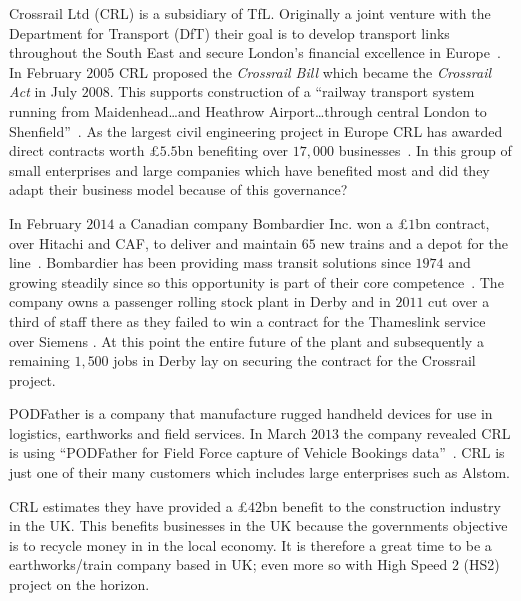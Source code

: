 {}

Crossrail Ltd (CRL) is a subsidiary of TfL.
Originally a joint venture with the Department for Transport (DfT) their goal is to develop transport links throughout the South East and secure London's financial excellence in Europe~\cite{crossrail:about}.
In February $2005$ CRL proposed the \emph{Crossrail Bill} which became the \emph{Crossrail Act} in July $2008$.
This supports construction of a ``railway transport system running from Maidenhead\dots and Heathrow Airport\dots through central London to Shenfield''~\cite{crossrail:act}.
As the largest civil engineering project in Europe CRL has awarded direct contracts worth \pounds $5.5$bn benefiting over $17,000$ businesses~\cite{crossrail:suppliers}.
In this group of small enterprises and large companies which have benefited most and did they adapt their business model because of this governance?  

In February $2014$ a Canadian company Bombardier Inc. won a \pounds $1$bn contract, over Hitachi and CAF, to deliver and maintain $65$ new trains and a depot for the line~\cite{bbc:bombardier,tfl:bombardier}.  
Bombardier has been providing mass transit solutions since $1974$ and growing steadily since so this opportunity is part of their core competence~\cite{bombardier:about}.
The company owns a passenger rolling stock plant in Derby and in $2011$ cut over a third of staff there as they failed to win a contract for the Thameslink service over Siemens \citeneeded{}.
At this point the entire future of the plant and subsequently a remaining $1,500$ jobs in Derby lay on securing the contract for the Crossrail project.

PODFather is a company that manufacture rugged handheld devices for use in logistics, earthworks and field services.
In March $2013$ the company revealed CRL is using ``PODFather for Field Force capture of Vehicle Bookings data''~\cite{podfather:crl}.
CRL is just one of their many customers which includes large enterprises such as Alstom. 


CRL estimates they have provided a \pounds $42$bn benefit to the construction industry in the UK.
This benefits businesses in the UK because the governments objective is to recycle money in in the local economy.
It is therefore a great time to be a earthworks/train company based in UK; even more so with High Speed 2 (HS2) project on the horizon.


